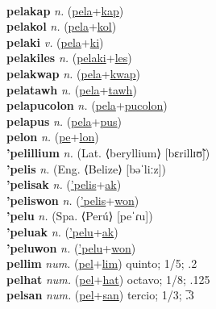  \label{pelafut} \\
\textbf{pelakap} \textit{n.} (\hyperref[pela]{pela}+\hyperref[kap]{kap})
 \label{pelakap} \\
\textbf{pelakol} \textit{n.} (\hyperref[pela]{pela}+\hyperref[kol]{kol})
 \label{pelakol} \\
\textbf{pelaki} \textit{v.} (\hyperref[pela]{pela}+\hyperref[ki]{ki})
 \label{pelaki} \\
\textbf{pelakiles} \textit{n.} (\hyperref[pelaki]{pelaki}+\hyperref[les]{les})
 \label{pelakiles} \\
\textbf{pelakwap} \textit{n.} (\hyperref[pela]{pela}+\hyperref[kwap]{kwap})
 \label{pelakwap} \\
\textbf{pelatawh} \textit{n.} (\hyperref[pela]{pela}+\hyperref[tawh]{tawh})
 \label{pelatawh} \\
\textbf{pelapucolon} \textit{n.} (\hyperref[pela]{pela}+\hyperref[pucolon]{pucolon})
 \label{pelapucolon} \\
\textbf{pelapus} \textit{n.} (\hyperref[pela]{pela}+\hyperref[pus]{pus})
 \label{pelapus} \\
\textbf{pelon} \textit{n.} (\hyperref[pe]{pe}+\hyperref[lon]{lon})
 \label{pelon} \\
\textbf{'pelillium} \textit{n.} (Lat. ⟨beryllium⟩ [bɛrillɪʊ̃])
 \label{'pelillium} \\
\textbf{'pelis} \textit{n.} (Eng. ⟨Belize⟩ [bəˈliːz])
 \label{'pelis} \\
\textbf{'pelisak} \textit{n.} (\hyperref['pelis]{'pelis}+\hyperref[ak]{ak})
 \label{'pelisak} \\
\textbf{'peliswon} \textit{n.} (\hyperref['pelis]{'pelis}+\hyperref[won]{won})
 \label{'peliswon} \\
\textbf{'pelu} \textit{n.} (Spa. ⟨Perú⟩ [peˈɾu])
 \label{'pelu} \\
\textbf{'peluak} \textit{n.} (\hyperref['pelu]{'pelu}+\hyperref[ak]{ak})
 \label{'peluak} \\
\textbf{'peluwon} \textit{n.} (\hyperref['pelu]{'pelu}+\hyperref[won]{won})
 \label{'peluwon} \\
\textbf{pellim} \textit{num.} (\hyperref[pel]{pel}+\hyperref[lim]{lim})
quinto; 1/5; .2 \label{pellim} \\
\textbf{pelhat} \textit{num.} (\hyperref[pel]{pel}+\hyperref[hat]{hat})
octavo; 1/8; .125 \label{pelhat} \\
\textbf{pelsan} \textit{num.} (\hyperref[pel]{pel}+\hyperref[san]{san})
tercio; 1/3; .̅3 \label{pelsan} \\
